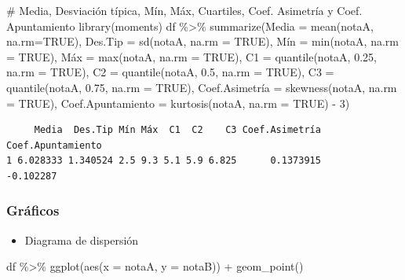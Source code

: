 \documentclass[
  spanish,
  a4paper,
]{scrreport}
\newenvironment{Shaded}{\begin{snugshade}}{\end{snugshade}}
\newcommand{\AttributeTok}[1]{\textcolor[rgb]{0.40,0.45,0.13}{#1}}
\newcommand{\CommentTok}[1]{\textcolor[rgb]{0.37,0.37,0.37}{#1}}
\newcommand{\ConstantTok}[1]{\textcolor[rgb]{0.56,0.35,0.01}{#1}}
\newcommand{\DecValTok}[1]{\textcolor[rgb]{0.68,0.00,0.00}{#1}}
\newcommand{\FloatTok}[1]{\textcolor[rgb]{0.68,0.00,0.00}{#1}}
\newcommand{\FunctionTok}[1]{\textcolor[rgb]{0.28,0.35,0.67}{#1}}
\newcommand{\NormalTok}[1]{\textcolor[rgb]{0.00,0.23,0.31}{#1}}
\newcommand{\OtherTok}[1]{\textcolor[rgb]{0.00,0.23,0.31}{#1}}
\newcommand{\SpecialCharTok}[1]{\textcolor[rgb]{0.37,0.37,0.37}{#1}}
\providecommand{\tightlist}{%
  \setlength{\itemsep}{0pt}\setlength{\parskip}{0pt}}
\theoremstyle{definition}
\theoremstyle{definition}
\theoremstyle{remark}
\begin{document}
\begin{Shaded}
\begin{Highlighting}[]
\CommentTok{\# Media, Desviación típica, Mín, Máx, Cuartiles, Coef. Asimetría y Coef. Apuntamiento}
\FunctionTok{library}\NormalTok{(moments)}
\NormalTok{df }\SpecialCharTok{\%\textgreater{}\%} \FunctionTok{summarize}\NormalTok{(}\AttributeTok{Media =} \FunctionTok{mean}\NormalTok{(notaA, }\AttributeTok{na.rm=}\ConstantTok{TRUE}\NormalTok{), }\AttributeTok{Des.Tip =} \FunctionTok{sd}\NormalTok{(notaA, }\AttributeTok{na.rm =} \ConstantTok{TRUE}\NormalTok{), Mín }\OtherTok{=} \FunctionTok{min}\NormalTok{(notaA, }\AttributeTok{na.rm =} \ConstantTok{TRUE}\NormalTok{), Máx }\OtherTok{=} \FunctionTok{max}\NormalTok{(notaA, }\AttributeTok{na.rm =} \ConstantTok{TRUE}\NormalTok{), }\AttributeTok{C1 =} \FunctionTok{quantile}\NormalTok{(notaA, }\FloatTok{0.25}\NormalTok{, }\AttributeTok{na.rm =} \ConstantTok{TRUE}\NormalTok{), }\AttributeTok{C2 =} \FunctionTok{quantile}\NormalTok{(notaA, }\FloatTok{0.5}\NormalTok{, }\AttributeTok{na.rm =} \ConstantTok{TRUE}\NormalTok{), }\AttributeTok{C3 =} \FunctionTok{quantile}\NormalTok{(notaA, }\FloatTok{0.75}\NormalTok{, }\AttributeTok{na.rm =} \ConstantTok{TRUE}\NormalTok{), Coef.Asimetría }\OtherTok{=} \FunctionTok{skewness}\NormalTok{(notaA, }\AttributeTok{na.rm =} \ConstantTok{TRUE}\NormalTok{), }\AttributeTok{Coef.Apuntamiento =} \FunctionTok{kurtosis}\NormalTok{(notaA, }\AttributeTok{na.rm =} \ConstantTok{TRUE}\NormalTok{) }\SpecialCharTok{{-}} \DecValTok{3}\NormalTok{)}
\end{Highlighting}
\end{Shaded}

\begin{verbatim}
     Media  Des.Tip Mín Máx  C1  C2    C3 Coef.Asimetría Coef.Apuntamiento
1 6.028333 1.340524 2.5 9.3 5.1 5.9 6.825      0.1373915         -0.102287
\end{verbatim}

\subsubsection{Gráficos}\label{gruxe1ficos-5}

\begin{itemize}
\tightlist
\item
  Diagrama de dispersión
\end{itemize}

\begin{Shaded}
\begin{Highlighting}[]
\NormalTok{df }\SpecialCharTok{\%\textgreater{}\%} \FunctionTok{ggplot}\NormalTok{(}\FunctionTok{aes}\NormalTok{(}\AttributeTok{x =}\NormalTok{ notaA, }\AttributeTok{y =}\NormalTok{ notaB)) }\SpecialCharTok{+} 
  \FunctionTok{geom\_point}\NormalTok{()}
\end{Highlighting}
\end{Shaded}
\end{document}
